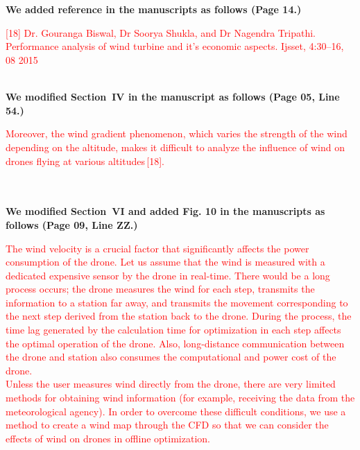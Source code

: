 \documentclass[onecolumn]{IEEEconf}
\begin{document}
\begin{description}
{	}
	~\\
    ~\\
	\textbf{We added reference in the manuscripts as follows (Page 14.)}\\
    \begin{mdframed}[ linewidth=.75pt, userdefinedwidth=0.9\textwidth]
    \textcolor{red}{[18] Dr. Gouranga Biswal,  Dr Soorya Shukla, and Dr Nagendra Tripathi. Performance analysis of wind turbine and it’s economic aspects. Ijsset, 4:30–16, 08 2015}
    \end{mdframed} 
    ~\\
    \textbf{We modified Section~IV in the manuscript as follows (Page 05, Line 54.)}\\
    \begin{mdframed}[ linewidth=.75pt, userdefinedwidth=0.9\textwidth]
    \textcolor{red}{Moreover, the wind gradient phenomenon, which varies the strength of the wind depending on the altitude, makes it difficult to analyze the influence of wind on drones flying at various altitudes\,[18].}
    \end{mdframed}
	~\\
	~\pagebreak~\\
	\textbf{We modified Section~VI and added Fig. 10 in the manuscripts as follows (Page 09, Line ZZ.)}\\
    \begin{mdframed}[ linewidth=.75pt, userdefinedwidth=0.9\textwidth]
    \justify
    \textcolor{red}{The wind velocity is a crucial factor that significantly affects the power consumption of the drone. Let us assume that the wind is measured with a dedicated expensive sensor by the drone in real-time. There would be a long process occurs; 
    the drone measures the wind for each step, transmits the information to a station far away, and transmits the movement corresponding to the next step derived from the station back to the drone.
    During the process, the time lag generated by the calculation time for optimization in each step affects the optimal operation of the drone. 
    Also, long-distance communication between the drone and station also consumes the computational and power cost of the drone.~\\
    Unless the user measures wind directly from the drone, there are very limited methods for obtaining wind information (for example, receiving the data from the meteorological agency).
    In order to overcome these difficult conditions, we use a method to create a wind map through the CFD so that we can consider the effects of wind on drones in offline optimization.
}
\end{mdframed}
\end{description}
\end{document}
